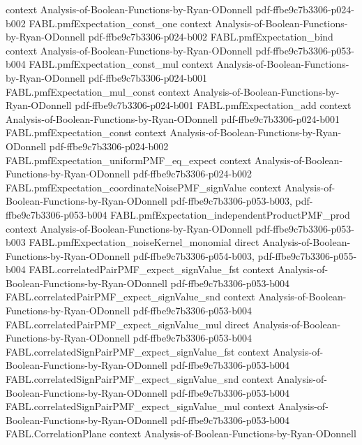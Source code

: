 \begin{theorem}
  {context}
  {Analysis-of-Boolean-Functions-by-Ryan-ODonnell}
  {pdf-ffbe9c7b3306-p024-b002}
\proofstep
  {FABL.pmfExpectation_const_one}
  {context}
  {Analysis-of-Boolean-Functions-by-Ryan-ODonnell}
  {pdf-ffbe9c7b3306-p024-b002}
\proofstep
  {FABL.pmfExpectation_bind}
  {context}
  {Analysis-of-Boolean-Functions-by-Ryan-ODonnell}
  {pdf-ffbe9c7b3306-p053-b004}
\proofstep
  {FABL.pmfExpectation_const_mul}
  {context}
  {Analysis-of-Boolean-Functions-by-Ryan-ODonnell}
  {pdf-ffbe9c7b3306-p024-b001}
\proofstep
  {FABL.pmfExpectation_mul_const}
  {context}
  {Analysis-of-Boolean-Functions-by-Ryan-ODonnell}
  {pdf-ffbe9c7b3306-p024-b001}
\proofstep
  {FABL.pmfExpectation_add}
  {context}
  {Analysis-of-Boolean-Functions-by-Ryan-ODonnell}
  {pdf-ffbe9c7b3306-p024-b001}
\proofstep
  {FABL.pmfExpectation_const}
  {context}
  {Analysis-of-Boolean-Functions-by-Ryan-ODonnell}
  {pdf-ffbe9c7b3306-p024-b002}
\proofstep
  {FABL.pmfExpectation_uniformPMF_eq_expect}
  {context}
  {Analysis-of-Boolean-Functions-by-Ryan-ODonnell}
  {pdf-ffbe9c7b3306-p024-b002}
\proofstep
  {FABL.pmfExpectation_coordinateNoisePMF_signValue}
  {context}
  {Analysis-of-Boolean-Functions-by-Ryan-ODonnell}
  {pdf-ffbe9c7b3306-p053-b003,
    pdf-ffbe9c7b3306-p053-b004}
\proofstep
  {FABL.pmfExpectation_independentProductPMF_prod}
  {context}
  {Analysis-of-Boolean-Functions-by-Ryan-ODonnell}
  {pdf-ffbe9c7b3306-p053-b003}
\proofstep
  {FABL.pmfExpectation_noiseKernel_monomial}
  {direct}
  {Analysis-of-Boolean-Functions-by-Ryan-ODonnell}
  {pdf-ffbe9c7b3306-p054-b003,
    pdf-ffbe9c7b3306-p055-b004}
\proofstep
  {FABL.correlatedPairPMF_expect_signValue_fst}
  {context}
  {Analysis-of-Boolean-Functions-by-Ryan-ODonnell}
  {pdf-ffbe9c7b3306-p053-b004}
\proofstep
  {FABL.correlatedPairPMF_expect_signValue_snd}
  {context}
  {Analysis-of-Boolean-Functions-by-Ryan-ODonnell}
  {pdf-ffbe9c7b3306-p053-b004}
\proofstep
  {FABL.correlatedPairPMF_expect_signValue_mul}
  {direct}
  {Analysis-of-Boolean-Functions-by-Ryan-ODonnell}
  {pdf-ffbe9c7b3306-p053-b004}
\proofstep
  {FABL.correlatedSignPairPMF_expect_signValue_fst}
  {context}
  {Analysis-of-Boolean-Functions-by-Ryan-ODonnell}
  {pdf-ffbe9c7b3306-p053-b004}
\proofstep
  {FABL.correlatedSignPairPMF_expect_signValue_snd}
  {context}
  {Analysis-of-Boolean-Functions-by-Ryan-ODonnell}
  {pdf-ffbe9c7b3306-p053-b004}
\proofstep
  {FABL.correlatedSignPairPMF_expect_signValue_mul}
  {context}
  {Analysis-of-Boolean-Functions-by-Ryan-ODonnell}
  {pdf-ffbe9c7b3306-p053-b004}
\proofstep
  {FABL.CorrelationPlane}
  {context}
  {Analysis-of-Boolean-Functions-by-Ryan-ODonnell}

\end{theorem}

